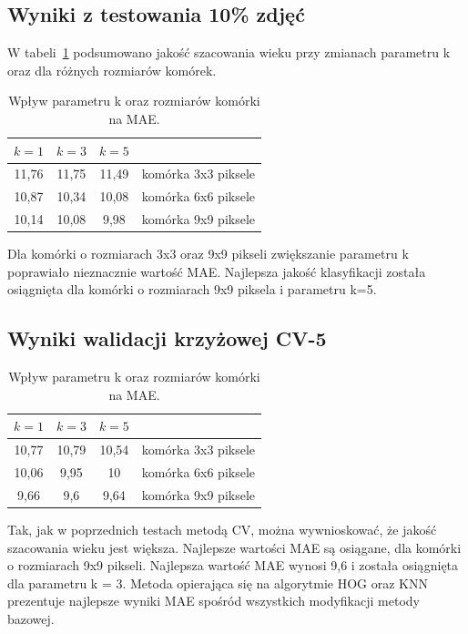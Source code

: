 \documentclass[a4paper,twoside,12pt]{book}
\begin{document}
    \subsection*{Wyniki z testowania 10\% zdjęć}
    W tabeli~\ref{tab.hogknn} podsumowano jakość szacowania wieku przy zmianach parametru k oraz dla różnych
    rozmiarów komórek.
    \begin{table}[h!]
        \centering
        \caption{Wpływ parametru k oraz rozmiarów komórki na MAE.}
        \begin{tabular}{|c|c|c|c|}
            \hline
            $k=1$ & $k=3$ & $k=5$ &                     \\ \hline
            11,76 & 11,75 & 11,49 & komórka 3x3 piksele \\ \hline
            10,87 & 10,34 & 10,08 & komórka 6x6 piksele \\ \hline
            10,14 & 10,08 & 9,98 & komórka 9x9 piksele \\ \hline
        \end{tabular}
        \label{tab.hogknn}
    \end{table}
    Dla komórki o rozmiarach 3x3 oraz 9x9 pikseli zwiększanie parametru k poprawiało nieznacznie wartość MAE.
    Najlepsza jakość klasyfikacji została osiągnięta dla komórki o rozmiarach 9x9 piksela i parametru k=5.
    \subsection*{Wyniki walidacji krzyżowej CV-5}

    \begin{table}[h!]
        \centering
        \caption{Wpływ parametru k oraz rozmiarów komórki na MAE.}
        \begin{tabular}{|c|c|c|c|}
            \hline
            $k=1$ & $k=3$ & $k=5$  &                     \\ \hline
            10,77 & 10,79 & 10,54 & komórka 3x3 piksele \\ \hline
            10,06 & 9,95 & 10 & komórka 6x6 piksele \\ \hline
            9,66 & 9,6 & 9,64 & komórka 9x9 piksele \\ \hline
        \end{tabular}
        \label{tab.hogknncv}
    \end{table}

    Tak, jak w poprzednich testach metodą CV, można wywnioskować, że jakość szacowania wieku jest większa.
    Najlepsze wartości MAE są osiągane, dla komórki o rozmiarach 9x9 pikseli. Najlepsza wartość MAE wynosi 9,6 i
    została osiągnięta dla parametru k = 3.
    Metoda opierająca się na algorytmie HOG oraz KNN prezentuje najlepsze wyniki MAE spośród wszystkich modyfikacji
    metody bazowej.
\end{document}
